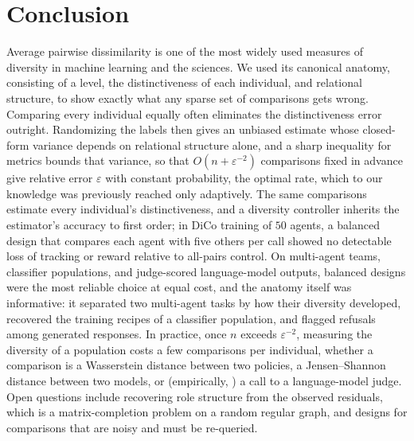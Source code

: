 \documentclass[twoside,11pt]{article}
\begin{document}
\section{Conclusion}
\label{sec:conclusion}

Average pairwise dissimilarity is one of the most widely used measures of
diversity in machine learning and the sciences. We used its canonical
anatomy, consisting of a level, the distinctiveness of each individual,
and relational structure, to show exactly what any sparse set of
comparisons gets wrong. Comparing every individual equally
often eliminates the distinctiveness error outright. Randomizing the labels
then gives an unbiased estimate whose closed-form variance depends on
relational structure alone, and a sharp inequality for metrics bounds that
variance, so that $O(n+\varepsilon^{-2})$ comparisons fixed in advance give
relative error $\varepsilon$ with constant probability, the optimal rate,
which to our knowledge was previously reached only adaptively. The same comparisons estimate every
individual's distinctiveness, and a diversity controller inherits the
estimator's accuracy to first order; in DiCo training of $50$ agents, a
balanced design that compares each agent with five others per call showed
no detectable loss of tracking or reward relative to all-pairs control. On
multi-agent teams, classifier populations, and judge-scored language-model
outputs, balanced designs were the most reliable choice at equal cost, and
the anatomy itself was informative: it separated two multi-agent tasks by
how their diversity developed, recovered the training recipes of a
classifier population, and flagged refusals among generated responses. In
practice, once $n$ exceeds $\varepsilon^{-2}$, measuring the diversity of a
population costs a few comparisons per individual, whether a comparison is a
Wasserstein distance between two policies, a Jensen--Shannon distance
between two models, or (empirically, ) a call to a
language-model judge. Open questions include recovering role structure from
the observed residuals, which is a matrix-completion problem on a random
regular graph, and designs for comparisons that are noisy and must be
re-queried.


\appendix



\FloatBarrier

\vskip 0.05in
\setlength{\bibsep}{0pt plus 0.3ex}

\end{document}
